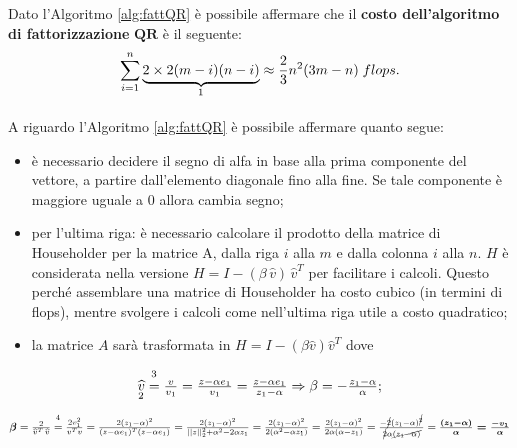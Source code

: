 Dato l'Algoritmo \ref{alg:fattQR} è possibile affermare che il \textbf{costo dell'algoritmo di fattorizzazione} $\boldsymbol{QR}$ è il seguente:
\begin{equation*}
    \sum_{i=1}^n\underbrace{2\times 2(m-i)(n-i)}_{\footnotemark}\approx \frac{2}{3}n^2 (3m-n) \;flops.
\end{equation*}

A riguardo l'Algoritmo \ref{alg:fattQR} è possibile affermare quanto segue:
\begin{itemize}
    \item è necessario decidere il segno di alfa in base alla prima componente del vettore, a partire dall'elemento diagonale fino alla fine. Se tale componente è maggiore uguale a 0 allora cambia segno;
    \item per l'ultima riga: è necessario calcolare il prodotto della matrice di Householder per la matrice A, dalla riga $i$ alla $m$ e dalla colonna $i$ alla $n$. $H$ è considerata nella versione $H=I-(\beta\,\widehat v)\,\widehat v^T$ per facilitare i calcoli. Questo perché assemblare una matrice di Householder ha costo cubico (in termini di flops), mentre svolgere i calcoli come nell'ultima riga utile a costo quadratico;
    \item la matrice $A$ sarà trasformata in $H=I-(\beta\widehat v)\widehat v^T$ dove
\end{itemize}
\begin{equation*}
    \begin{matrix}
        \underset{\footnotemark}{\widehat v} \overset{\footnotemark}{=} \frac{v}{v_1} = \frac{z-\alpha e_1}{v_1} = \frac{z-\alpha e_1}{z_1-\alpha}\Rightarrow \beta = -\frac{z_1-\alpha}{\alpha};
    \end{matrix}
\end{equation*}
\begin{equation*}
     \begin{matrix}
            \boldsymbol\beta = \frac{2}{\widehat v^T\,\widehat v}\overset{\footnotemark}{=} \frac{2v_1^2}{v^Tv} = \frac{2(z_1-\alpha)^2}{(z-\alpha e_1)^T(z-\alpha e_1)}= \frac{2(z_1-\alpha)^2}{||z||_2^2+\alpha^2-2\alpha z_1}= \frac{2(z_1-\alpha)^2}{2(\alpha^2-\alpha z_1)}= \frac{2(z_1-\alpha)^2}{2\alpha (\alpha -z_1)}=\frac{-\cancel{2}(z_1-\alpha)^{\cancel{2}}}{\cancel{2}\alpha\cancel{(z_1-\alpha)}}=\boldsymbol{\frac{(z_1-\alpha)}{\alpha}=\frac{-v_1}{\alpha}}
    \end{matrix}
\end{equation*}

